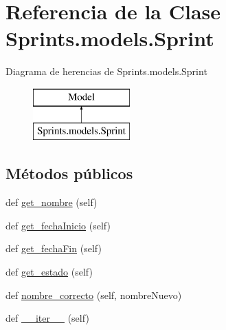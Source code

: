 \hypertarget{class_sprints_1_1models_1_1_sprint}{}\section{Referencia de la Clase Sprints.\+models.\+Sprint}
\label{class_sprints_1_1models_1_1_sprint}
Diagrama de herencias de Sprints.\+models.\+Sprint\begin{figure}[H]
\begin{center}
\leavevmode
\includegraphics[height=2.000000cm]{class_sprints_1_1models_1_1_sprint}
\end{center}
\end{figure}
\subsection*{Métodos públicos}
\begin{DoxyCompactItemize}
\item 
def \hyperlink{class_sprints_1_1models_1_1_sprint_ac1769b1a95d70d6d1f33b68c3f955c63}{get\+\_\+nombre} (self)
\item 
def \hyperlink{class_sprints_1_1models_1_1_sprint_a88cf4f82119e2f6ab9d641618a9e77b5}{get\+\_\+fecha\+Inicio} (self)
\item 
def \hyperlink{class_sprints_1_1models_1_1_sprint_ae7ec3e6432269e2ddabecdcdc967bbd7}{get\+\_\+fecha\+Fin} (self)
\item 
def \hyperlink{class_sprints_1_1models_1_1_sprint_a2544130663a3a223422064df662a9d02}{get\+\_\+estado} (self)
\item 
def \hyperlink{class_sprints_1_1models_1_1_sprint_aed513ecf7b351c2f2e4cd7cf26e9f7fd}{nombre\+\_\+correcto} (self, nombre\+Nuevo)
\item 
def \hyperlink{class_sprints_1_1models_1_1_sprint_a39e13487b84a64f15b16a0d752f85602}{\+\_\+\+\_\+iter\+\_\+\+\_\+} (self)
\end{DoxyCompactItemize}
